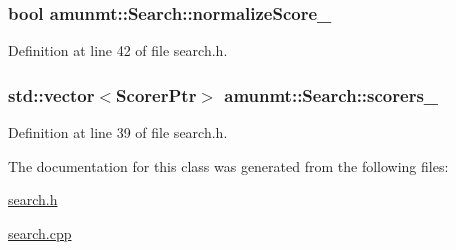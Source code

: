 \subsubsection[{\texorpdfstring{normalize\+Score\+\_\+}{normalizeScore_}}]{\setlength{\rightskip}{0pt plus 5cm}bool amunmt\+::\+Search\+::normalize\+Score\+\_\+\hspace{0.3cm}{\ttfamily [protected]}}\hypertarget{classamunmt_1_1Search_a5eecaafd5f951a216e0a4e1873c0b392}{}\label{classamunmt_1_1Search_a5eecaafd5f951a216e0a4e1873c0b392}


Definition at line 42 of file search.\+h.

\subsubsection[{\texorpdfstring{scorers\+\_\+}{scorers_}}]{\setlength{\rightskip}{0pt plus 5cm}std\+::vector$<${\bf Scorer\+Ptr}$>$ amunmt\+::\+Search\+::scorers\+\_\+\hspace{0.3cm}{\ttfamily [protected]}}\hypertarget{classamunmt_1_1Search_a9cbbe53cebfb587a8db93618bf56ea13}{}\label{classamunmt_1_1Search_a9cbbe53cebfb587a8db93618bf56ea13}


Definition at line 39 of file search.\+h.



The documentation for this class was generated from the following files\+:\begin{DoxyCompactItemize}
\item 
\hyperlink{search_8h}{search.\+h}\item 
\hyperlink{search_8cpp}{search.\+cpp}\end{DoxyCompactItemize}
